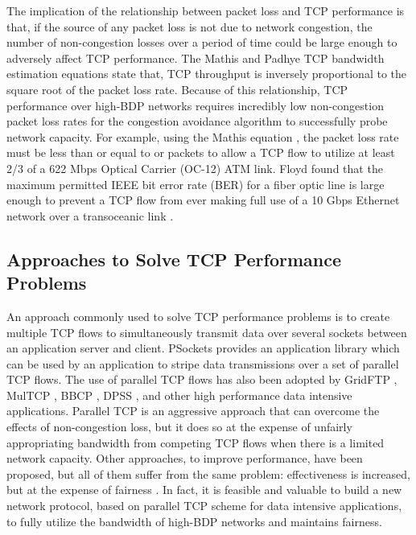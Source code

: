 \documentclass[a4paper, conference]{IEEEtran}
\begin{document}
The implication of the relationship between packet loss and TCP performance is that, if the source of any packet loss is not due to network congestion, the number of non-congestion losses over a period of time could be large enough to adversely affect TCP performance. The Mathis \cite{Mathis1997} and Padhye \cite{padhye1998} TCP bandwidth estimation equations state that, TCP throughput is inversely proportional to the square root of the packet loss rate. Because of this relationship, TCP performance over high-BDP networks requires incredibly low non-congestion packet loss rates for the congestion avoidance algorithm to successfully probe network capacity. For example, using the Mathis equation \cite{Mathis1997}, the packet loss rate must be less than or equal to  or  packets to allow a TCP flow to utilize at least 2/3 of a 622 Mbps Optical Carrier (OC-12) ATM link. Floyd found that the maximum permitted IEEE bit error rate (BER) for a fiber optic line is large enough to prevent a TCP flow from ever making full use of a 10 Gbps Ethernet network over a transoceanic link \cite{hacker2004}.

\subsection{Approaches to Solve TCP Performance Problems}

An approach commonly used to solve TCP performance problems is to create multiple TCP flows to simultaneously transmit data over several sockets between an application server and client. PSockets \cite{sivakumar2000} provides an application library which can be used by an application to stripe data transmissions over a set of parallel TCP flows. The use of parallel TCP flows has also been adopted by GridFTP \cite{allcock2005}, MulTCP \cite{crowcroft1998}, BBCP \cite{hanushevsky2001}, DPSS \cite{Tierney1994}, and other high performance data intensive applications. Parallel TCP is an aggressive approach that can overcome the effects of non-congestion loss, but it does so at the expense of unfairly appropriating bandwidth from competing TCP flows when there is a limited network capacity. Other approaches, to improve performance, have been proposed, but all of them suffer from the same problem: effectiveness is increased, but at the expense of fairness \cite{hacker2004}. In fact, it is feasible and valuable to build a new network protocol, based on parallel TCP scheme for data intensive applications, to fully utilize the bandwidth of high-BDP networks and maintains fairness.
\end{document}
